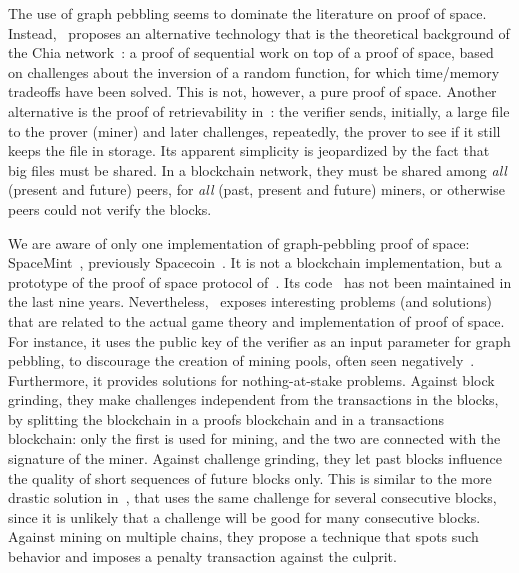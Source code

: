 The use of graph pebbling seems to dominate the literature on proof of space.
Instead, \cite{AbusalahACKPR17}~proposes an alternative technology that is the
theoretical background of the Chia network~\cite{CohenP19,Chia}:
a proof of sequential work on top of a proof of space, based on challenges
about the inversion of a random function, for which time/memory tradeoffs have been solved.
This is not, however, a pure proof of space.
Another alternative is the proof of retrievability
in~\cite{JuelsK07}: the verifier sends, initially,
a large file to the prover (miner) and later challenges, repeatedly, the prover to see
if it still keeps the file in storage. Its apparent simplicity
is jeopardized by the fact that big files must be shared.
In a blockchain network, they must be shared among \emph{all} (present and future)
peers, for \emph{all} (past, present and future) miners, or otherwise peers
could not verify the blocks.

We are aware of only one implementation of graph-pebbling proof of space:
SpaceMint~\cite{ParkKFGAP18}, previously Spacecoin~\cite{ParkPAFG15}.
It is not a blockchain implementation,
but a prototype of the proof of space protocol of~\cite{DziembowskiFKP15}.
Its code~\cite{SpaceMintCode} has not been maintained in the last nine years.
Nevertheless, \cite{ParkKFGAP18}~exposes interesting problems (and solutions)
that are related to the actual game theory and implementation of proof of space.
For instance, it uses the public key of the verifier as an input parameter
for graph pebbling, to discourage the creation of mining pools, often seen
negatively~\cite{MillerKKS15}.
Furthermore, it provides solutions for nothing-at-stake problems. Against block grinding,
they make challenges independent from the transactions in the blocks, by splitting the
blockchain in a proofs blockchain and in a transactions blockchain:
only the first is used for mining,
and the two are connected with the signature of the miner.
Against challenge grinding, they let past blocks influence the quality of short sequences
of future blocks only. This is similar to the more drastic solution in~\cite{CohenP19}, that
uses the same challenge for several consecutive blocks,
since it is unlikely that a challenge will be good for many consecutive blocks.
Against mining on multiple chains, they propose a technique that spots such behavior and
imposes a penalty transaction against the culprit.

